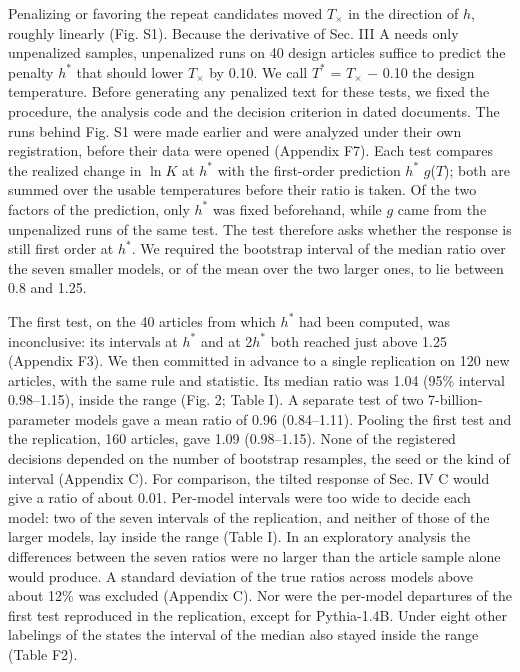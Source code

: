 \documentclass[aps,prx,onecolumn,superscriptaddress,longbibliography]{revtex4-2}
\begin{document}
Penalizing or favoring the repeat candidates moved \(T_{\times}\) in the direction of \(h\), roughly linearly (Fig. S1). Because the derivative of Sec. III A needs only unpenalized samples, unpenalized runs on 40 design articles suffice to predict the penalty \(h^*\) that should lower \(T_{\times}\) by 0.10. We call \(T^*\) = \(T_{\times}\) − 0.10 the design temperature. Before generating any penalized text for these tests, we fixed the procedure, the analysis code and the decision criterion in dated documents. The runs behind Fig. S1 were made earlier and were analyzed under their own registration, before their data were opened (Appendix F7). Each test compares the realized change in \(\ln K\) at \(h^*\) with the first-order prediction \(h^*\) \(g\)(\(T\)); both are summed over the usable temperatures before their ratio is taken. Of the two factors of the prediction, only \(h^*\) was fixed beforehand, while \(g\) came from the unpenalized runs of the same test. The test therefore asks whether the response is still first order at \(h^*\). We required the bootstrap interval of the median ratio over the seven smaller models, or of the mean over the two larger ones, to lie between 0.8 and 1.25.

The first test, on the 40 articles from which \(h^*\) had been computed, was inconclusive: its intervals at \(h^*\) and at 2\(h^*\) both reached just above 1.25 (Appendix F3). We then committed in advance to a single replication on 120 new articles, with the same rule and statistic. Its median ratio was 1.04 (95\% interval 0.98--1.15), inside the range (Fig. 2; Table I). A separate test of two 7-billion-parameter models gave a mean ratio of 0.96 (0.84--1.11). Pooling the first test and the replication, 160 articles, gave 1.09 (0.98--1.15). None of the registered decisions depended on the number of bootstrap resamples, the seed or the kind of interval (Appendix C). For comparison, the tilted response of Sec. IV C would give a ratio of about 0.01. Per-model intervals were too wide to decide each model: two of the seven intervals of the replication, and neither of those of the larger models, lay inside the range (Table I). In an exploratory analysis the differences between the seven ratios were no larger than the article sample alone would produce. A standard deviation of the true ratios across models above about 12\% was excluded (Appendix C). Nor were the per-model departures of the first test reproduced in the replication, except for Pythia-1.4B. Under eight other labelings of the states the interval of the median also stayed inside the range (Table F2).
\end{document}
